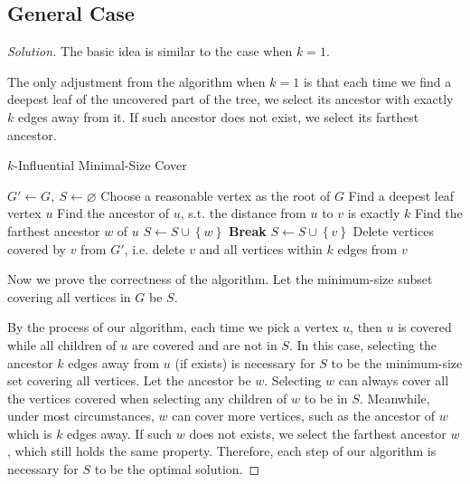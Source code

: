 \documentclass{article}
\newcommand{\set}[1]{\left\{#1\right\}}
\newenvironment{solution}{\begin{proof}[\noindent\it Solution]}{\end{proof}}
\begin{document}
\subsection{General Case}
\vspace{1em}
\begin{solution}
    The basic idea is similar to the case when $k=1$. 
    
    \hspace{2.6em}
    The only adjustment from the algorithm when $k=1$ is that each time we find a deepest leaf of the uncovered part of the tree, we select its ancestor with exactly $k$ edges away from it. If such ancestor does not exist, we select its farthest ancestor.
    
    \begin{algorithm}
        \caption{$k$-Influential Minimal-Size Cover}
        
	    {
	        $G'\gets G,\ S\gets \varnothing$\;
	        Choose a reasonable vertex as the root of $G$\;
	        {
	            Find a deepest leaf vertex $u$\;
	            Find the ancestor of $u$, s.t. the distance from $u$ to $v$ is exactly $k$\;
	            {
	            Find the farthest ancestor $w$ of $u$\;
	            $S\gets S\cup \set{w}$\;
	            \textbf{Break}\;
	            }
	            $S\gets S\cup \set{v}$\;
	            Delete vertices covered by $v$ from $G'$, i.e. delete $v$ and all vertices within $k$ edges from $v$\;
	        }
	   }
    \end{algorithm}
    
    \hspace{2.6em}
    Now we prove the correctness of the algorithm. Let the minimum-size subset covering all vertices in $G$ be $S$.
    
    \hspace{2.6em}
    By the process of our algorithm, each time we pick a vertex $u$, then $u$ is covered while all children of $u$ are covered and are not in $S$. In this case, selecting the ancestor $k$ edges away from $u$ (if exists) is necessary for $S$ to be the minimum-size set covering all vertices. Let the ancestor be $w$. Selecting $w$ can always cover all the vertices covered when selecting any children of $w$ to be in $S$. Meanwhile, under most circumstances, $w$ can cover more vertices, such as the ancestor of $w$ which is $k$ edges away. If such $w$ does not exists, we select the farthest ancestor $w$, which still holds the same property. Therefore, each step of our algorithm is necessary for $S$ to be the optimal solution.
    

\end{solution}
\end{document}

